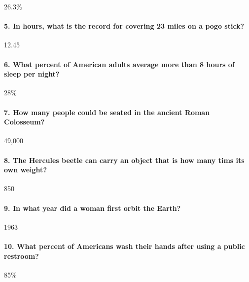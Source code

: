\documentclass[]{article}
\let\oldparagraph\paragraph
\renewcommand{\paragraph}[1]{\oldparagraph{#1}\mbox{}}
\begin{document}
26.3\%

\paragraph{5. In hours, what is the record for covering 23 miles on a
pogo
stick?}\label{in-hours-what-is-the-record-for-covering-23-miles-on-a-pogo-stick}

12.45

\paragraph{6. What percent of American adults average more than 8 hours
of sleep per
night?}\label{what-percent-of-american-adults-average-more-than-8-hours-of-sleep-per-night}

28\%

\paragraph{7. How many people could be seated in the ancient Roman
Colosseum?}\label{how-many-people-could-be-seated-in-the-ancient-roman-colosseum}

49,000

\paragraph{8. The Hercules beetle can carry an object that is how many
tims its own
weight?}\label{the-hercules-beetle-can-carry-an-object-that-is-how-many-tims-its-own-weight}

850

\paragraph{9. In what year did a woman first orbit the
Earth?}\label{in-what-year-did-a-woman-first-orbit-the-earth}

1963

\paragraph{10. What percent of Americans wash their hands after using a
public
restroom?}\label{what-percent-of-americans-wash-their-hands-after-using-a-public-restroom}

85\%
\end{document}
